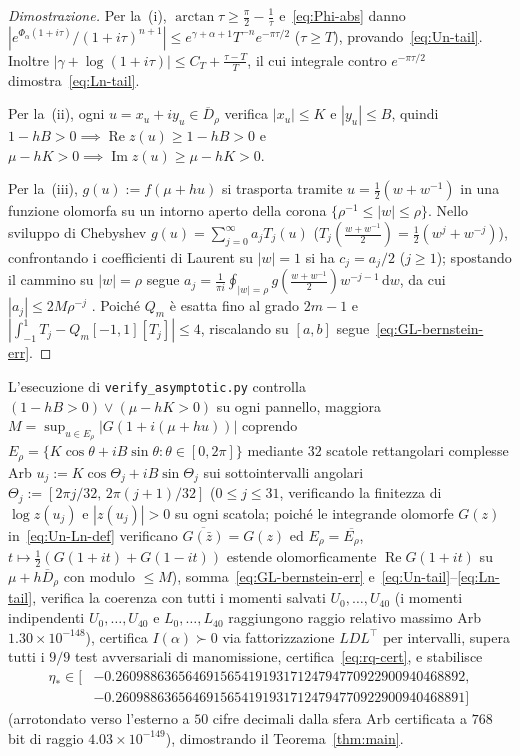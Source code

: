 \documentclass[11pt, reqno]{amsart}
\theoremstyle{remark}
\numberwithin{equation}{section}
\DeclareMathOperator{\re}{Re}
\DeclareMathOperator{\im}{Im}
\newcommand{\dd}{\,\mathrm{d}}
\begin{document}
\begin{proof}[Dimostrazione]
Per la~(i), $\arctan\tau \ge \frac{\pi}{2} - \frac{1}{\tau}$ e~\eqref{eq:Phi-abs} danno
$|e^{\Phi_\alpha(1+i\tau)}/(1+i\tau)^{n+1}| \le e^{\gamma+\alpha+1} T^{-n} e^{-\pi\tau/2}$ ($\tau \ge T$),
provando~\eqref{eq:Un-tail}. Inoltre $|\gamma+\log(1+i\tau)| \le C_T + \frac{\tau-T}{T}$, il cui integrale
contro $e^{-\pi\tau/2}$ dimostra~\eqref{eq:Ln-tail}.

Per la~(ii), ogni $u = x_u + i y_u \in \overline{D}_\rho$ verifica $|x_u| \le K$ e $|y_u| \le B$, quindi
$1 - hB > 0 \implies \re z(u) \ge 1 - hB > 0$ e $\mu - hK > 0 \implies \im z(u) \ge \mu - hK > 0$.

Per la~(iii), $g(u) := f(\mu+h u)$ si trasporta tramite $u = \frac{1}{2}(w+w^{-1})$ in una funzione
olomorfa su un intorno aperto della corona $\{\rho^{-1} \le |w| \le \rho\}$. Nello sviluppo di Chebyshev
$g(u) = \sum_{j=0}^\infty a_j T_j(u)$ ($T_j(\frac{w+w^{-1}}{2}) = \frac{1}{2}(w^j+w^{-j})$), confrontando i
coefficienti di Laurent su $|w| = 1$ si ha $c_j = a_j/2$ ($j \ge 1$); spostando il cammino su $|w| = \rho$
segue $a_j = \frac{1}{\pi i}\oint_{|w|=\rho} g(\frac{w+w^{-1}}{2}) w^{-j-1}\dd w$, da cui
$|a_j| \le 2M\rho^{-j}$ \cite{Trefethen}. Poiché $Q_m$ è esatta fino al grado $2m-1$ e
$|\int_{-1}^1 T_j - Q_m[-1,1][T_j]| \le 4$, riscalando su $[a,b]$ segue~\eqref{eq:GL-bernstein-err}.
\end{proof}

L'esecuzione di \texttt{verify\_asymptotic.py} controlla $(1-hB > 0)\lor(\mu-hK > 0)$ su ogni pannello,
maggiora $M = \sup_{u\in E_\rho} |G(1+i(\mu+hu))|$ coprendo $E_\rho = \{K\cos\theta + i B\sin\theta : \theta \in [0, 2\pi]\}$ mediante $32$
scatole rettangolari complesse Arb $u_j := K\cos\Theta_j + i B\sin\Theta_j$ sui sottointervalli
angolari $\Theta_j := [2\pi j/32,\, 2\pi(j+1)/32]$ ($0 \le j \le 31$, verificando la finitezza di
$\log z(u_j)$ e $|z(u_j)| > 0$ su ogni scatola; poiché le integrande olomorfe $G(z)$ in~\eqref{eq:Un-Ln-def}
verificano $\overline{G(\bar{z})} = G(z)$ ed $E_\rho = \overline{E_\rho}$, $t \mapsto \frac{1}{2}(G(1+it)+G(1-it))$
estende olomorficamente $\re G(1+it)$ su $\mu+h\overline{D}_\rho$ con modulo $\le M$), somma~\eqref{eq:GL-bernstein-err} e~\eqref{eq:Un-tail}--\eqref{eq:Ln-tail},
verifica la coerenza con tutti i momenti salvati $U_0,\dots,U_{40}$ (i momenti indipendenti
$U_0,\dots,U_{40}$ e $L_0,\dots,L_{40}$ raggiungono raggio relativo massimo Arb $1.30 \times 10^{-148}$),
certifica $I(\alpha) \succ 0$ via fattorizzazione $LDL^\top$ per intervalli,
supera tutti i $9/9$ test avversariali di manomissione, certifica~\eqref{eq:rq-cert}, e stabilisce
\begin{equation}\label{eq:eta-cert}
\begin{aligned}
\eta_* \in \bigl[&{-0.26098863656469156541919317124794770922900940468892},\\
&{-0.26098863656469156541919317124794770922900940468891}\bigr]
\end{aligned}
\end{equation}
(arrotondato verso l'esterno a $50$ cifre decimali dalla sfera Arb certificata a $768$ bit di raggio
$4.03 \times 10^{-149}$), dimostrando il Teorema~\ref{thm:main}.
\end{document}
